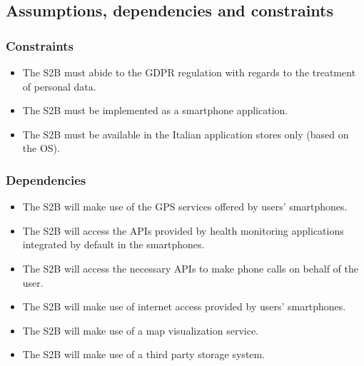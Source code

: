 \documentclass[titlepage]{article}
\begin{document}
	\subsection{Assumptions, dependencies and constraints}
		\subsubsection{Constraints}
		\begin{itemize}
		\item The S2B must abide to the GDPR regulation with regards to the treatment of personal data.
\item The S2B must be implemented as a smartphone application.
\item The S2B must be available in the Italian application stores only (based on the OS).

		\end{itemize}
		\subsubsection{Dependencies}
		\begin{itemize}
		\item The S2B will make use of the GPS services offered by users’ smartphones.
\item The S2B will access the APIs provided by health monitoring applications integrated by default in the smartphones.
\item The S2B will access the necessary APIs to make phone calls on behalf of the user.
\item The S2B will make use of internet access provided by users’ smartphones. 
\item The S2B will make use of a map visualization service.
\item The S2B will make use of a third party storage system.
		\end{itemize}
		
\end{document}
